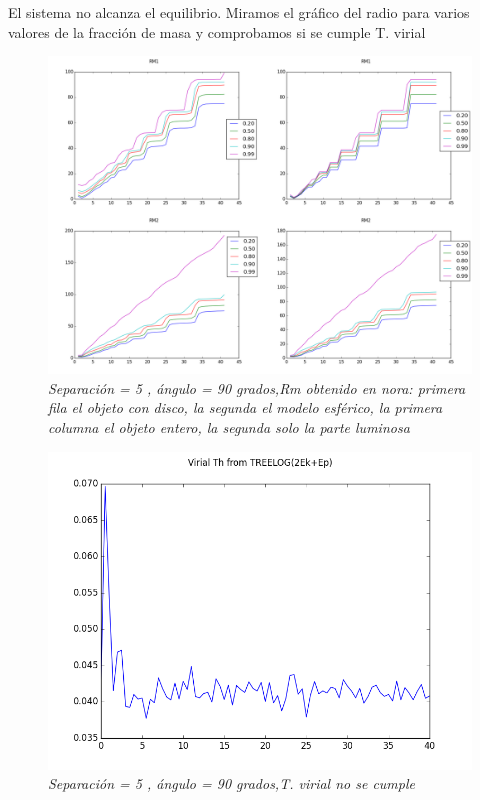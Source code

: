 \documentclass[12pt]{article} %
\renewcommand{\=}[1]{\stackrel{#1}{=}} %
\theoremstyle{definition}
\theoremstyle{remark}
\begin{document}
\clearpage
\newpage
El sistema no alcanza el equilibrio. Miramos el gráfico del radio para varios valores de la fracción de masa y comprobamos si se cumple T. virial

\begin{figure}[!ht]
 \centering
 \includegraphics[scale=0.2]{rmsep5.png}
 \caption{\emph{ Separación = 5 , ángulo = 90 grados,Rm obtenido en nora: primera fila el objeto con disco, la segunda el modelo esférico, la primera columna el objeto entero, la segunda solo la parte luminosa }}
\end{figure}

\begin{figure}[!ht]
 \centering
 \includegraphics[scale=0.4]{vt.png}
 \caption{\emph{ Separación = 5 , ángulo = 90 grados,T. virial no se cumple }}
\end{figure}
\end{document}
